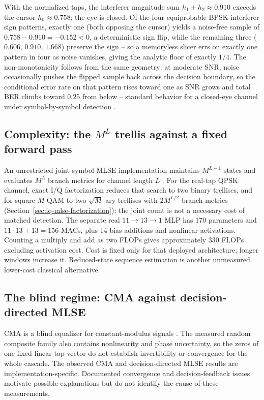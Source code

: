 With the normalized taps, the interferer magnitude sum $h_1 + h_2 \approx 0.910$ exceeds the cursor $h_0 \approx 0.758$: the eye is closed. Of the four equiprobable BPSK interferer sign patterns, exactly one (both opposing the cursor) yields a noise-free sample of $0.758 - 0.910 = -0.152 < 0$, a deterministic sign flip, while the remaining three ($0.606$, $0.910$, $1.668$) preserve the sign -- so a memoryless slicer errs on exactly one pattern in four as noise vanishes, giving the analytic floor of exactly $1/4$. The non-monotonicity follows from the same geometry: at moderate SNR, noise occasionally pushes the flipped sample back across the decision boundary, so the conditional error rate on that pattern rises toward one as SNR grows and total BER climbs toward $0.25$ from below -- standard behavior for a closed-eye channel under symbol-by-symbol detection \cite{LuckySalzWeldon1968, ProakisSalehi2008DigitalComm}.

\subsection{\texorpdfstring{Complexity: the $M^{L}$ trellis against a fixed forward pass}{Complexity: the M to the L trellis against a fixed forward pass}}
An unrestricted joint-symbol MLSE implementation maintains $M^{L-1}$ states and evaluates $M^L$ branch metrics for channel length $L$ \cite{Forney1972MLSE,ProakisSalehi2008DigitalComm}. For the real-tap QPSK channel, exact I/Q factorization reduces that search to two binary trellises, and for square $M$-QAM to two $\sqrt{M}$-ary trellises with $2M^{L/2}$ branch metrics (Section~\ref{sec:iq-mlse-factorization}); the joint count is not a necessary cost of matched detection. The separate real $11\to13\to1$ MLP has $170$ parameters and $11\cdot13+13=156$ MACs, plus 14 bias additions and nonlinear activations. Counting a multiply and add as two FLOPs gives approximately 330 FLOPs excluding activation cost. Cost is fixed only for that deployed architecture; longer windows increase it. Reduced-state sequence estimation \cite{EyuboqluQureshi1988RSSE} is another unmeasured lower-cost classical alternative.

\subsection{The blind regime: CMA against decision-directed MLSE}

CMA is a blind equalizer for constant-modulus signals \cite{Godard1980SelfRecovering,TreichlerAgee1983CMA}. The measured random composite family also contains nonlinearity and phase uncertainty, so the zeros of one fixed linear tap vector do not establish invertibility or convergence for the whole cascade. The observed CMA and decision-directed MLSE results are implementation-specific. Documented convergence and decision-feedback issues \cite{Ding1991IllConvergence,RaheliPolydorosTzou1995PSP} motivate possible explanations but do not identify the cause of these measurements.

